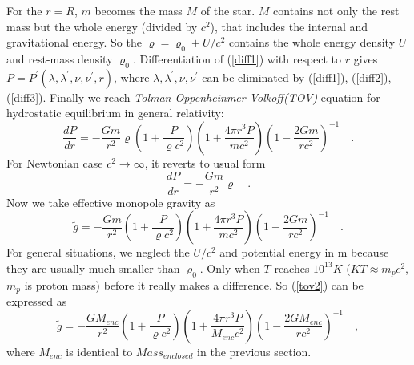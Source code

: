 For the $r = R$, $m$ becomes the mass $M$ of the star. $M$ contains not only the rest mass but
the whole energy (divided by $c^2$), that includes the internal and gravitational energy. So the
 $\varrho = \varrho_0 +U/c^2$ contains the whole energy density $U$ and rest-mass density $\varrho_0$. 
Differentiation of (\ref{diff1}) with respect to $r$ gives $P = P^{\prime}(\lambda,\lambda^{\prime},
\nu,\nu^{\prime},r)$, where $\lambda,\lambda^{\prime},\nu,\nu^{\prime}$  can be eliminated by (\ref{diff1}), 
(\ref{diff2}), (\ref{diff3}). Finally we reach \textit{Tolman-Oppenheinmer-Volkoff(TOV)} equation for 
hydrostatic equilibrium in general relativity:
\begin{equation}\label{tov}
  \frac{dP}{dr} = -\frac{Gm}{r^{2}}\varrho (1+\frac{P}{\varrho
    c^{2}})(1+\frac{4\pi r^3 P}{m c^{2}}) (1-\frac{2Gm}{r c^{2}})^{-1} \quad .
\end{equation}                  
For Newtonian case $c^2 \rightarrow  \infty $, it reverts to usual form
\begin{equation}\label{newton}
  \frac{dP}{dr} = -\frac{Gm}{r^{2}}\varrho \quad .
\end{equation}
Now we take effective monopole gravity as
\begin{equation}\label{tov2}                                                      
\tilde{g} = -\frac{Gm}{r^{2}} (1+\frac{P}{\varrho
  c^{2}})(1+\frac{4\pi r^3 P}{m c^{2}}) (1-\frac{2Gm}{r c^{2}})^{-1}  \quad .
\end{equation}                                 
For general situations, we neglect the $U/c^2$ and potential energy in m because they are usually
much smaller than $\varrho_0$. Only when $T$ reaches $10^{13} K$ ($KT \approx m_{p} c^2$, $m_p$ is proton mass)
 before it really makes a difference. So (\ref{tov2}) can be expressed as
\begin{equation}\label{tov3}                                                      
  \tilde{g} = -\frac{GM_{enc}}{r^{2}} (1+\frac{P}{\varrho
    c^{2}})(1+\frac{4\pi r^3 P}{M_{enc} c^{2}}) (1-\frac{2GM_{enc}}{r c^{2}})^{-1} \quad ,
\end{equation}                                              
where $M_{enc}$ is identical to $Mass_{enclosed}$ in the previous section.
